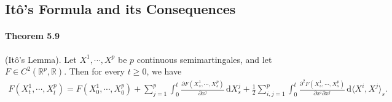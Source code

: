 \documentclass{article}
\numberwithin{equation}{section}
\renewcommand{\d}{\mathrm{d}}
\theoremstyle{plain}
\theoremstyle{definition}
\begin{document}
\subsection{Itô's Formula and its Consequences}
\paragraph{Theorem 5.9\label{thm:5.9}} (Itô's Lemma). Let $X^1,\cdots,X^p$ be $p$ continuous semimartingales, and let $F\in C^2(\mathbb{R}^p,\mathbb{R})$. Then for every $t\geq 0$, we have
\begin{align*}
	F(X^1_t,\cdots,X_t^p)=F(X_0^1,\cdots,X_0^p)+\sum_{j=1}^p\int_0^t\frac{\partial F(X_s^1,\cdots,X_s^p)}{\partial x^j}\,\d X_s^j + \frac{1}{2}\sum_{i,j=1}^p\int_0^t\frac{\partial^2 F(X_s^1,\cdots,X_s^p)}{\partial x^i\partial x^j}\,\d \langle X^i,X^j\rangle_s.
\end{align*}
\end{document}
